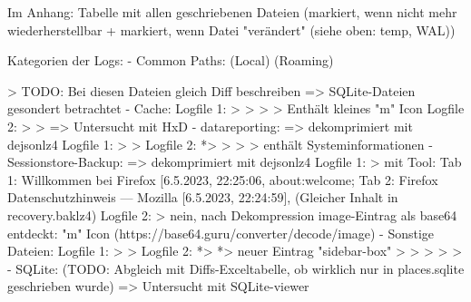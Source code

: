 Im Anhang: Tabelle mit allen geschriebenen Dateien (markiert, wenn nicht mehr wiederherstellbar + markiert, wenn Datei "verändert" (siehe oben: temp, WAL))

Kategorien der Logs:
- Common Paths:
	(Local) %
	(Roaming) %

> TODO: Bei diesen Dateien gleich Diff beschreiben => SQLite-Dateien gesondert betrachtet
- Cache: 
	Logfile 1:
		> %
		> %
		> %
		> %
			Enthält kleines "m" Icon
	Logfile 2:
		> %
		> %
			=> Untersucht mit HxD
- datareporting:
	=> dekomprimiert mit dejsonlz4
	Logfile 1:
		> %
		> %
	Logfile 2:
		*> %
		> %
		> %
		> %
			enthält Systeminformationen
- Sessionstore-Backup:
	=> dekomprimiert mit dejsonlz4
	Logfile 1:
		> %
			mit Tool: Tab 1:  Willkommen bei Firefox [6.5.2023, 22:25:06, about:welcome;
			Tab 2:  Firefox Datenschutzhinweis — Mozilla [6.5.2023, 22:24:59], %
			(Gleicher Inhalt in recovery.baklz4)
	Logfile 2:
		> %
			nein, nach Dekompression image-Eintrag als base64 entdeckt: "m" Icon
			(https://base64.guru/converter/decode/image)
- Sonstige Dateien:
	Logfile 1:
		> %
		> %
	Logfile 2:
		*> %
		*> %
			neuer Eintrag "sidebar-box"
		> %
		> %
		> %
		> %
		> %
- SQLite: (TODO: Abgleich mit Diffs-Exceltabelle, ob wirklich nur in places.sqlite geschrieben wurde)
	=> Untersucht mit SQLite-viewer

